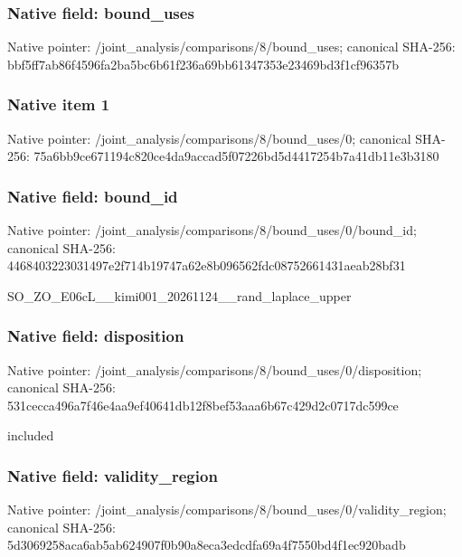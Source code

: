 \documentclass[10pt,a4paper]{article}
\begin{document}
\subsubsection{Native field: bound\_uses}


Native pointer: /joint\_analysis/comparis\allowbreak{}ons/8/bound\_uses; canonical SHA-256: bbf5ff7ab86f4596fa2ba5bc\allowbreak{}6b61f236a69bb61347353e23\allowbreak{}469bd3f1cf96357b



\subsubsection{Native item 1}


Native pointer: /joint\_analysis/comparis\allowbreak{}ons/8/bound\_uses/0; canonical SHA-256: 75a6bb9ce671194c820ce4da\allowbreak{}9accad5f07226bd5d4417254\allowbreak{}b7a41db11e3b3180



\subsubsection{Native field: bound\_id}


Native pointer: /joint\_analysis/comparis\allowbreak{}ons/8/bound\_uses/0/bound\allowbreak{}\_id; canonical SHA-256: 4468403223031497e2f714b1\allowbreak{}9747a62e8b096562fdc08752\allowbreak{}661431aeab28bf31


SO\_ZO\_E06cL\_\_kimi001\_202\allowbreak{}61124\_\_rand\_laplace\_uppe\allowbreak{}r


\subsubsection{Native field: disposition}


Native pointer: /joint\_analysis/comparis\allowbreak{}ons/8/bound\_uses/0/dispo\allowbreak{}sition; canonical SHA-256: 531cecca496a7f46e4aa9ef4\allowbreak{}0641db12f8bef53aaa6b67c4\allowbreak{}29d2c0717dc599ce


included


\subsubsection{Native field: validity\_region}


Native pointer: /joint\_analysis/comparis\allowbreak{}ons/8/bound\_uses/0/valid\allowbreak{}ity\_region; canonical SHA-256: 5d3069258aca6ab5ab624907\allowbreak{}f0b90a8eca3edcdfa69a4f75\allowbreak{}50bd4f1ec920badb
\end{document}
